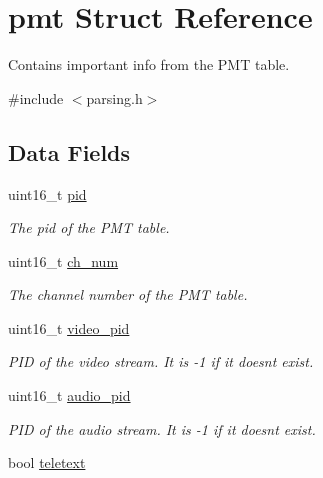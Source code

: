 \hypertarget{structpmt}{}\section{pmt Struct Reference}
\label{structpmt}


Contains important info from the P\+MT table.  




{\ttfamily \#include $<$parsing.\+h$>$}

\subsection*{Data Fields}
\begin{DoxyCompactItemize}
\item 
uint16\+\_\+t \hyperlink{structpmt_a94da4c86fc671f2e2ca0b3197291c999}{pid}\hypertarget{structpmt_a94da4c86fc671f2e2ca0b3197291c999}{}\label{structpmt_a94da4c86fc671f2e2ca0b3197291c999}

\begin{DoxyCompactList}\small\item\em The pid of the P\+MT table. \end{DoxyCompactList}\item 
uint16\+\_\+t \hyperlink{structpmt_a32019497634c4f6e6b842d79f3417187}{ch\+\_\+num}\hypertarget{structpmt_a32019497634c4f6e6b842d79f3417187}{}\label{structpmt_a32019497634c4f6e6b842d79f3417187}

\begin{DoxyCompactList}\small\item\em The channel number of the P\+MT table. \end{DoxyCompactList}\item 
uint16\+\_\+t \hyperlink{structpmt_a49cc267d734db2def0cd6af31fdc60a8}{video\+\_\+pid}\hypertarget{structpmt_a49cc267d734db2def0cd6af31fdc60a8}{}\label{structpmt_a49cc267d734db2def0cd6af31fdc60a8}

\begin{DoxyCompactList}\small\item\em P\+ID of the video stream. It is -\/1 if it doesn\textquotesingle{}t exist. \end{DoxyCompactList}\item 
uint16\+\_\+t \hyperlink{structpmt_a68081a602490e42492431056f72efbd7}{audio\+\_\+pid}\hypertarget{structpmt_a68081a602490e42492431056f72efbd7}{}\label{structpmt_a68081a602490e42492431056f72efbd7}

\begin{DoxyCompactList}\small\item\em P\+ID of the audio stream. It is -\/1 if it doesn\textquotesingle{}t exist. \end{DoxyCompactList}\item 
bool \hyperlink{structpmt_ad1ddfb7a259bcc79f882418f46225e2e}{teletext}\hypertarget{structpmt_ad1ddfb7a259bcc79f882418f46225e2e}{}\label{structpmt_ad1ddfb7a259bcc79f882418f46225e2e}


\end{DoxyCompactItemize}
